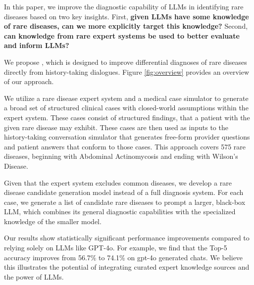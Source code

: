 In this paper, we improve the diagnostic capability of LLMs in identifying rare diseases based on two key insights. First, \textbf{given LLMs have some knowledge of rare diseases, can we more explicitly target this knowledge?}  Second, \textbf{can knowledge from rare expert systems be used to better evaluate and inform LLMs?}

We propose \methodname, which is designed to improve differential diagnoses of rare diseases directly from history-taking dialogues.  Figure \ref{fig:overview} provides an overview of our approach. 

We utilize a rare disease expert system and a medical case simulator to generate a broad set of structured clinical cases with closed-world assumptions within the expert system. These cases consist of structured findings, that a patient with the given rare disease may exhibit. These cases are then used as inputs to the history-taking conversation simulator that generates free-form provider questions and patient answers that conform to those cases. This approach covers 575 rare diseases, beginning with Abdominal Actinomycosis and ending with Wilson's Disease. 

Given that the expert system excludes common diseases, we develop a rare disease candidate generation model instead of a full diagnosis system. For each case, we generate a list of candidate rare diseases to prompt a larger, black-box LLM, which combines its general diagnostic capabilities with the specialized knowledge of the smaller model.

Our results show statistically significant performance improvements compared to relying solely on LLMs like GPT-4o.  For example, we find that the Top-5 accuracy improves from 56.7\% to 74.1\% on gpt-4o generated chats.  We believe this illustrates the potential of integrating curated expert knowledge sources and the power of LLMs.
